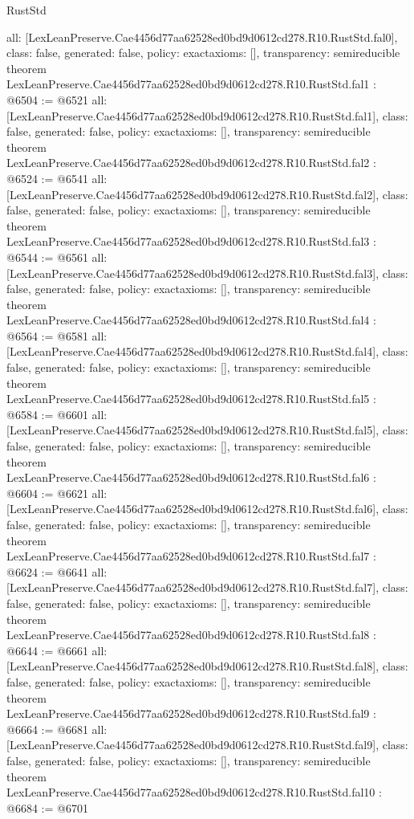 \begin{lexlean}{RustStd}
\begin{coremodule}
{  all: [LexLeanPreserve.Cae4456d77aa62528ed0bd9d0612cd278.R10.RustStd.fal0],
  class: false,
  generated: false,
  policy: exact{axioms: []},
  transparency: semireducible
}
theorem LexLeanPreserve.Cae4456d77aa62528ed0bd9d0612cd278.R10.RustStd.fal1 : @6504 := @6521 {
  all: [LexLeanPreserve.Cae4456d77aa62528ed0bd9d0612cd278.R10.RustStd.fal1],
  class: false,
  generated: false,
  policy: exact{axioms: []},
  transparency: semireducible
}
theorem LexLeanPreserve.Cae4456d77aa62528ed0bd9d0612cd278.R10.RustStd.fal2 : @6524 := @6541 {
  all: [LexLeanPreserve.Cae4456d77aa62528ed0bd9d0612cd278.R10.RustStd.fal2],
  class: false,
  generated: false,
  policy: exact{axioms: []},
  transparency: semireducible
}
theorem LexLeanPreserve.Cae4456d77aa62528ed0bd9d0612cd278.R10.RustStd.fal3 : @6544 := @6561 {
  all: [LexLeanPreserve.Cae4456d77aa62528ed0bd9d0612cd278.R10.RustStd.fal3],
  class: false,
  generated: false,
  policy: exact{axioms: []},
  transparency: semireducible
}
theorem LexLeanPreserve.Cae4456d77aa62528ed0bd9d0612cd278.R10.RustStd.fal4 : @6564 := @6581 {
  all: [LexLeanPreserve.Cae4456d77aa62528ed0bd9d0612cd278.R10.RustStd.fal4],
  class: false,
  generated: false,
  policy: exact{axioms: []},
  transparency: semireducible
}
theorem LexLeanPreserve.Cae4456d77aa62528ed0bd9d0612cd278.R10.RustStd.fal5 : @6584 := @6601 {
  all: [LexLeanPreserve.Cae4456d77aa62528ed0bd9d0612cd278.R10.RustStd.fal5],
  class: false,
  generated: false,
  policy: exact{axioms: []},
  transparency: semireducible
}
theorem LexLeanPreserve.Cae4456d77aa62528ed0bd9d0612cd278.R10.RustStd.fal6 : @6604 := @6621 {
  all: [LexLeanPreserve.Cae4456d77aa62528ed0bd9d0612cd278.R10.RustStd.fal6],
  class: false,
  generated: false,
  policy: exact{axioms: []},
  transparency: semireducible
}
theorem LexLeanPreserve.Cae4456d77aa62528ed0bd9d0612cd278.R10.RustStd.fal7 : @6624 := @6641 {
  all: [LexLeanPreserve.Cae4456d77aa62528ed0bd9d0612cd278.R10.RustStd.fal7],
  class: false,
  generated: false,
  policy: exact{axioms: []},
  transparency: semireducible
}
theorem LexLeanPreserve.Cae4456d77aa62528ed0bd9d0612cd278.R10.RustStd.fal8 : @6644 := @6661 {
  all: [LexLeanPreserve.Cae4456d77aa62528ed0bd9d0612cd278.R10.RustStd.fal8],
  class: false,
  generated: false,
  policy: exact{axioms: []},
  transparency: semireducible
}
theorem LexLeanPreserve.Cae4456d77aa62528ed0bd9d0612cd278.R10.RustStd.fal9 : @6664 := @6681 {
  all: [LexLeanPreserve.Cae4456d77aa62528ed0bd9d0612cd278.R10.RustStd.fal9],
  class: false,
  generated: false,
  policy: exact{axioms: []},
  transparency: semireducible
}
theorem LexLeanPreserve.Cae4456d77aa62528ed0bd9d0612cd278.R10.RustStd.fal10 : @6684 := @6701 {
}
\end{coremodule}
\end{lexlean}

